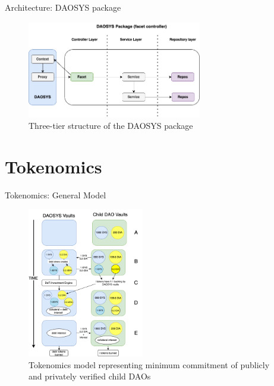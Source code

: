 \documentclass[10pt,xcolor=svgnames]{beamer} %
\begin{document}
\begin{frame}{Architecture: DAOSYS package}

\begin{figure}[h!]
\includegraphics[width=3in]{img/three_tier_package.png}
\caption{Three-tier structure of the DAOSYS package} 
\label{fig:daosys_governance}
\end{figure}

\end{frame}




\section{Tokenomics}

\begin{frame}{Tokenomics: General Model}

\begin{figure}[h!]
\includegraphics[width=2in]{img/tokenomics_model.png}
\caption{Tokenomics model representing minimum commitment of publicly and privately verified child DAOs} 
\label{fig:tokenomics_model}
\end{figure}

\end{frame}
\end{document}
